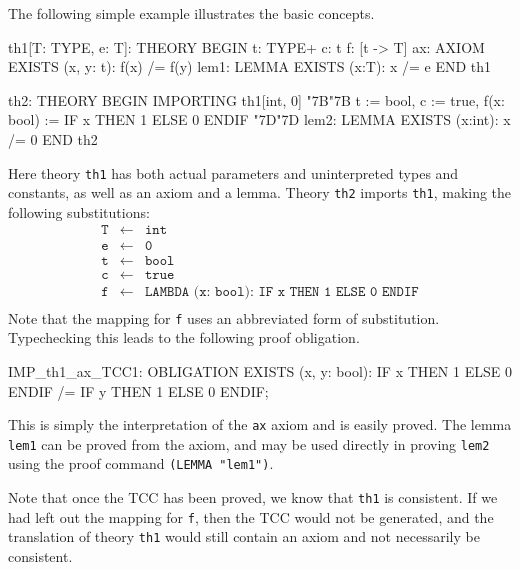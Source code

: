 \documentclass[11pt,twoside,openright,titlepage]{cslreport}
\def\mapb{\char"7B\char"7B}
\def\mape{\char"7D\char"7D}
\begin{document}
The following simple example illustrates the
basic concepts.
\begin{session}
th1[T: TYPE, e: T]: THEORY
 BEGIN
  t: TYPE+
  c: t
  f: [t -> T]
  ax: AXIOM EXISTS (x, y: t): f(x) /= f(y)
  lem1: LEMMA EXISTS (x:T): x /= e
 END th1
\end{session}
\begin{session}
th2: THEORY
 BEGIN
  IMPORTING th1[int, 0]
               \mapb{} t := bool,
                  c := true,
                  f(x: bool) := IF x THEN 1 ELSE 0 ENDIF \mape{}
  lem2: LEMMA EXISTS (x:int): x /= 0
 END th2
\end{session}
\noindent Here theory \texttt{th1} has both actual parameters and
uninterpreted types and constants, as well as an axiom and
a lemma.  Theory \texttt{th2} imports \texttt{th1}, making the
following substitutions:
\setlength{\jot}{-2pt}
\setlength{\abovedisplayskip}{0pt}
\setlength{\belowdisplayskip}{0pt}
{\smaller\begin{eqnarray*}
\texttt{T} & \leftarrow & \texttt{int} \\
\texttt{e} & \leftarrow & \texttt{0} \\
\texttt{t} & \leftarrow & \texttt{bool} \\
\texttt{c} & \leftarrow & \texttt{true} \\
\texttt{f} & \leftarrow & \texttt{LAMBDA (x:\ bool):\ IF x THEN 1 ELSE 0 ENDIF} \\
\end{eqnarray*}}
Note that the mapping for \texttt{f} uses an abbreviated form of
substitution.  Typechecking this leads to the following proof obligation.
\begin{session}
IMP_th1_ax_TCC1: OBLIGATION
  EXISTS (x, y: bool):
    IF x THEN 1 ELSE 0 ENDIF /= IF y THEN 1 ELSE 0 ENDIF;
\end{session}
This is simply the interpretation of the \texttt{ax} axiom and is easily
proved.  The lemma \texttt{lem1} can be proved from the axiom, and may
be used directly in proving \texttt{lem2} using the proof command
\texttt{(LEMMA "lem1")}.

Note that once the TCC has been proved, we know that \texttt{th1} is
consistent.  If we had left out the mapping for \texttt{f}, then the TCC
would not be generated, and the translation of theory \texttt{th1} would
still contain an axiom and not necessarily be consistent.

\end{document}
